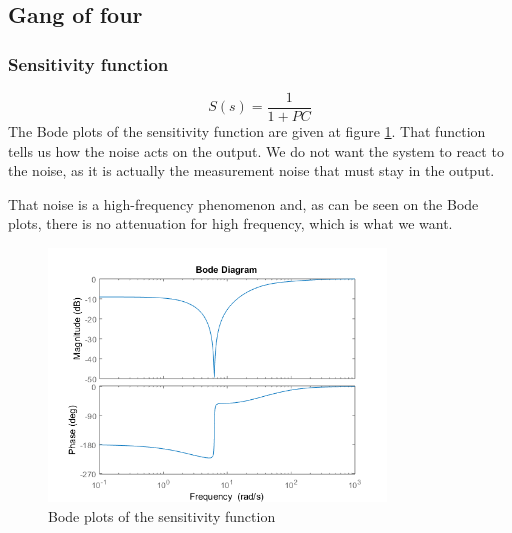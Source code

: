\subsection{Gang of four}

\subsubsection{Sensitivity function}
$$
S(s) = \dfrac{1}{1 + PC}
$$
The Bode plots of the sensitivity function are given at figure \ref{fig:sensitivity}. That function tells us how the noise acts on the output. We do not want the system to react to the noise, as it is actually the measurement noise that must stay in the output.\par
That noise is a high-frequency phenomenon and, as can be seen on the Bode plots, there is no attenuation for high frequency, which is what we want.
\begin{figure}[H]
    \centering
    \includegraphics[width=0.8\textwidth]{resources/png/sensitivity.png}
    \caption{Bode plots of the sensitivity function}
    \label{fig:sensitivity}
\end{figure}

